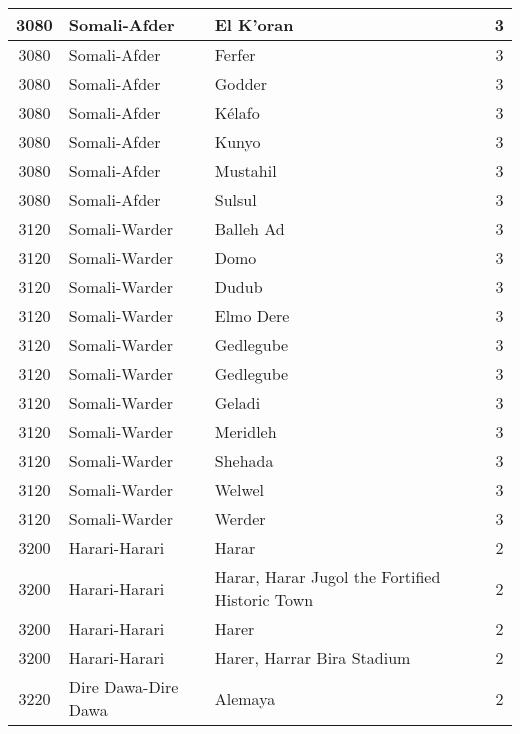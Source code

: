 \documentclass[12pt,a4paper]{report}
\begin{document}
\begin{tabular}{|c|l|l|c|}
\hline 
\rule[-1ex]{0pt}{2.5ex} 3080 & Somali-Afder & El K'oran & 3 \\ 
\hline 
\rule[-1ex]{0pt}{2.5ex} 3080 & Somali-Afder & Ferfer & 3 \\ 
\hline 
\rule[-1ex]{0pt}{2.5ex} 3080 & Somali-Afder & Godder & 3 \\ 
\hline 
\rule[-1ex]{0pt}{2.5ex} 3080 & Somali-Afder & K\'elafo & 3 \\ 
\hline 
\rule[-1ex]{0pt}{2.5ex} 3080 & Somali-Afder & Kunyo & 3 \\ 
\hline 
\rule[-1ex]{0pt}{2.5ex} 3080 & Somali-Afder & Mustahil & 3 \\ 
\hline 
\rule[-1ex]{0pt}{2.5ex} 3080 & Somali-Afder & Sulsul & 3 \\ 
\hline 
\rule[-1ex]{0pt}{2.5ex} 3120 & Somali-Warder & Balleh Ad & 3 \\
\hline 
\rule[-1ex]{0pt}{2.5ex} 3120 & Somali-Warder & Domo & 3 \\
\hline 
\rule[-1ex]{0pt}{2.5ex} 3120 & Somali-Warder & Dudub & 3 \\
\hline 
\rule[-1ex]{0pt}{2.5ex} 3120 & Somali-Warder & Elmo Dere & 3 \\
\hline 
\rule[-1ex]{0pt}{2.5ex} 3120 & Somali-Warder & Gedlegube & 3 \\
\hline 
\rule[-1ex]{0pt}{2.5ex} 3120 & Somali-Warder & Gedlegube & 3 \\
\hline 
\rule[-1ex]{0pt}{2.5ex} 3120 & Somali-Warder & Geladi & 3 \\
\hline 
\rule[-1ex]{0pt}{2.5ex} 3120 & Somali-Warder & Meridleh & 3 \\
\hline 
\rule[-1ex]{0pt}{2.5ex} 3120 & Somali-Warder & Shehada & 3 \\
\hline 
\rule[-1ex]{0pt}{2.5ex} 3120 & Somali-Warder & Welwel & 3 \\
\hline 
\rule[-1ex]{0pt}{2.5ex} 3120 & Somali-Warder & Werder & 3 \\
\hline 
\rule[-1ex]{0pt}{2.5ex} 3200 & Harari-Harari & Harar & 2 \\ 
\hline 
\rule[-1ex]{0pt}{2.5ex} 3200 & Harari-Harari & Harar, Harar Jugol the Fortified Historic Town & 2 \\ 
\hline 
\rule[-1ex]{0pt}{2.5ex} 3200 & Harari-Harari & Harer & 2 \\  
\hline 
\rule[-1ex]{0pt}{2.5ex} 3200 & Harari-Harari & Harer, Harrar Bira Stadium & 2 \\ 
\hline 
\rule[-1ex]{0pt}{2.5ex} 3220 & Dire Dawa-Dire Dawa & Alemaya & 2 \\ 
\hline 

\end{tabular}
\end{document}
